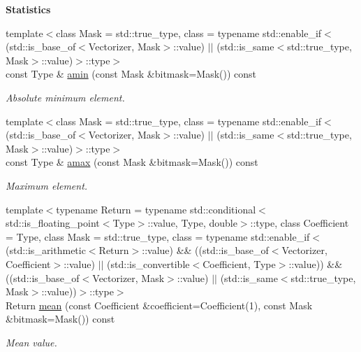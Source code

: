 \begin{Indent}{\bf Statistics}\par
\begin{DoxyCompactItemize}
\item 
{\footnotesize template$<$class Mask  = std\-::true\-\_\-type, class  = typename std\-::enable\-\_\-if$<$(std\-::is\-\_\-base\-\_\-of$<$\-Vectorizer, Mask$>$\-::value) $|$$|$ (std\-::is\-\_\-same$<$std\-::true\-\_\-type, Mask$>$\-::value)$>$\-::type$>$ }\\const Type \& \hyperlink{classmagrathea_1_1AbstractNArray_adae70c0a4e039fadd7f7f4465a0eb807}{amin} (const Mask \&bitmask=Mask()) const 
\begin{DoxyCompactList}\small\item\em Absolute minimum element. \end{DoxyCompactList}\item 
{\footnotesize template$<$class Mask  = std\-::true\-\_\-type, class  = typename std\-::enable\-\_\-if$<$(std\-::is\-\_\-base\-\_\-of$<$\-Vectorizer, Mask$>$\-::value) $|$$|$ (std\-::is\-\_\-same$<$std\-::true\-\_\-type, Mask$>$\-::value)$>$\-::type$>$ }\\const Type \& \hyperlink{classmagrathea_1_1AbstractNArray_a1d90cc2cfa8c89d68e9c7543ae76dba6}{amax} (const Mask \&bitmask=Mask()) const 
\begin{DoxyCompactList}\small\item\em Maximum element. \end{DoxyCompactList}\item 
{\footnotesize template$<$typename Return  = typename std\-::conditional$<$std\-::is\-\_\-floating\-\_\-point$<$\-Type$>$\-::value, Type, double$>$\-::type, class Coefficient  = Type, class Mask  = std\-::true\-\_\-type, class  = typename std\-::enable\-\_\-if$<$(std\-::is\-\_\-arithmetic$<$\-Return$>$\-::value) \&\& ((std\-::is\-\_\-base\-\_\-of$<$\-Vectorizer, Coefficient$>$\-::value) $|$$|$ (std\-::is\-\_\-convertible$<$\-Coefficient, Type$>$\-::value)) \&\& ((std\-::is\-\_\-base\-\_\-of$<$\-Vectorizer, Mask$>$\-::value) $|$$|$ (std\-::is\-\_\-same$<$std\-::true\-\_\-type, Mask$>$\-::value))$>$\-::type$>$ }\\Return \hyperlink{classmagrathea_1_1AbstractNArray_ad713b22a7477479c8e6163deb643d02f}{mean} (const Coefficient \&coefficient=Coefficient(1), const Mask \&bitmask=Mask()) const 
\begin{DoxyCompactList}\small\item\em Mean value. \end{DoxyCompactList}\item 

\end{DoxyCompactItemize}
\end{Indent}
